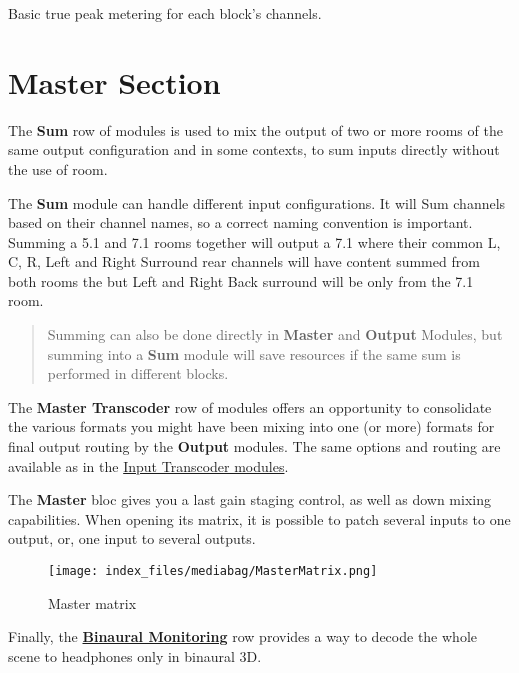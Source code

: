 \documentclass[
  letterpaper,
  DIV=11,
  numbers=noendperiod]{scrreport}
\begin{document}
Basic true peak metering for each block's channels.

\hypertarget{master-section}{%
\chapter{Master Section}\label{master-section}}

The \textbf{Sum} row of modules is used to mix the output of two or more
rooms of the same output configuration and in some contexts, to sum
inputs directly without the use of room.

The \textbf{Sum} module can handle different input configurations. It
will Sum channels based on their channel names, so a correct naming
convention is important. Summing a 5.1 and 7.1 rooms together will
output a 7.1 where their common L, C, R, Left and Right Surround rear
channels will have content summed from both rooms the but Left and Right
Back surround will be only from the 7.1 room.

\begin{quote}
Summing can also be done directly in \textbf{Master} and \textbf{Output}
Modules, but summing into a \textbf{Sum} module will save resources if
the same sum is performed in different blocks.
\end{quote}

The \textbf{Master Transcoder} row of modules offers an opportunity to
consolidate the various formats you might have been mixing into one (or
more) formats for final output routing by the \textbf{Output} modules.
The same options and routing are available as in the
\href{Spat_Environment_Input_Transcoder_Modules.md}{Input Transcoder
modules}.

The \textbf{Master} bloc gives you a last gain staging control, as well
as down mixing capabilities. When opening its matrix, it is possible to
patch several inputs to one output, or, one input to several outputs.

\begin{figure}

{\centering \texttt{[image: index\_files/mediabag/MasterMatrix.png]}

}

\caption{Master matrix}

\end{figure}

Finally, the
\href{5_Spatialisation_Technology_5_1_Binaural_5_1_Binaural?id=binaural-monitoring-module.md}{\textbf{Binaural
Monitoring}} row provides a way to decode the whole scene to headphones
only in binaural 3D.
\end{document}
